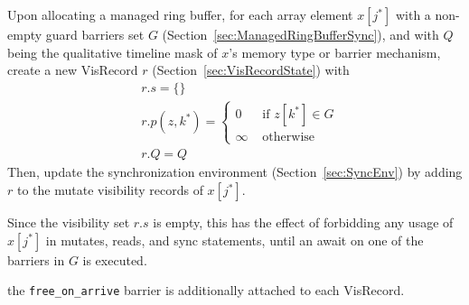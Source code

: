 

Upon allocating a managed ring buffer, for each array element $x[j^*]$ with a non-empty guard barriers set $G$ (Section~\ref{sec:ManagedRingBufferSync}), and with $Q$ being the qualitative timeline mask of $x$'s memory type or barrier mechanism, create a new \textsf{VisRecord} $r$ (Section~\ref{sec:VisRecordState}) with
\begin{align*}
  & r.s = \{\} \\
  & r.p(z, k^*) = \begin{cases}
    0 & \text{ if } z[k^*] \in G \\
    \infty & \text{ otherwise}
  \end{cases} \\
  & r.Q = Q
\end{align*}
Then, update the synchronization environment (Section~\ref{sec:SyncEnv}) by adding $r$ to the mutate visibility records of $x[j^*]$.

Since the visibility set $r.s$ is empty, this has the effect of forbidding any usage of $x[j^*]$ in mutates, reads, and sync statements, until an await on one of the barriers in $G$ is executed.

 the \texttt{free\_on\_arrive} barrier is additionally attached to each \textsf{VisRecord}.
